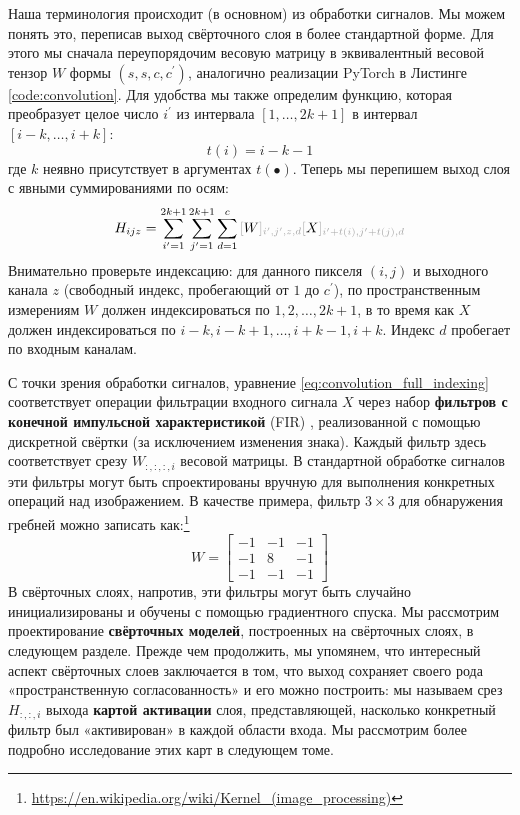 \addteacup Наша терминология происходит (в основном) из обработки сигналов. Мы можем понять это, переписав выход свёрточного слоя в более стандартной форме. Для этого мы сначала переупорядочим весовую матрицу в эквивалентный весовой тензор $W$ формы $(s,s,c,c^\prime)$, аналогично реализации PyTorch в Листинге \ref{code:convolution}. Для удобства мы также определим функцию, которая преобразует целое число $i^\prime$ из интервала $\left[1, \ldots, 2k+1\right]$ в интервал $\left[ i - k, \ldots, i + k\right]$:
%
\begin{equation}
t(i) = i - k - 1
\label{eq:convolutive_offset}
\end{equation}
%
где $k$ неявно присутствует в аргументах $t(\bullet)$. Теперь мы перепишем выход слоя с явными суммированиями по осям:
%
\begin{equation}
H_{ijz} = \sum_{i^\prime=1}^{2k+1}\sum_{j^\prime = 1}^{2k+1}\sum_{d=1}^{c} \idx{W}{i^\prime, j^\prime, z, d}\idx{X}{i^\prime+t(i),j^\prime+t(j), d}
\label{eq:convolution_full_indexing}
\end{equation}
%
Внимательно проверьте индексацию: для данного пикселя $(i,j)$ и выходного канала $z$ (свободный индекс, пробегающий от $1$ до $c^\prime$), по пространственным измерениям $W$ должен индексироваться по $1, 2, \ldots, 2k+1$, в то время как $X$ должен индексироваться по $i-k, i-k+1, \ldots, i+k-1,i+k$. Индекс $d$ пробегает по входным каналам.

С точки зрения обработки сигналов, уравнение \eqref{eq:convolution_full_indexing} соответствует операции фильтрации входного сигнала $X$ через набор \textbf{фильтров с конечной импульсной характеристикой} (FIR) \cite{uncini2015fundamentals}, реализованной с помощью дискретной свёртки (за исключением изменения знака). Каждый фильтр здесь соответствует срезу $W_{:,:,:,i}$ весовой матрицы. В стандартной обработке сигналов эти фильтры могут быть спроектированы вручную для выполнения конкретных операций над изображением. В качестве примера, фильтр $3 \times 3$ для обнаружения гребней можно записать как:\footnote{\url{https://en.wikipedia.org/wiki/Kernel_(image_processing)}}
%
$$
W =\begin{bmatrix}-1&-1&-1\\-1&8&-1\\-1&-1&-1\end{bmatrix}
$$
%
В свёрточных слоях, напротив, эти фильтры могут быть случайно инициализированы и обучены с помощью градиентного спуска. Мы рассмотрим проектирование \textbf{свёрточных моделей}, построенных на свёрточных слоях, в следующем разделе. Прежде чем продолжить, мы упомянем, что интересный аспект свёрточных слоев заключается в том, что выход сохраняет своего рода «пространственную согласованность» и его можно построить: мы называем срез $H_{:,:,i}$ выхода \textbf{картой активации} слоя, представляющей, насколько конкретный фильтр был «активирован» в каждой области входа. Мы рассмотрим более подробно исследование этих карт в следующем томе.

